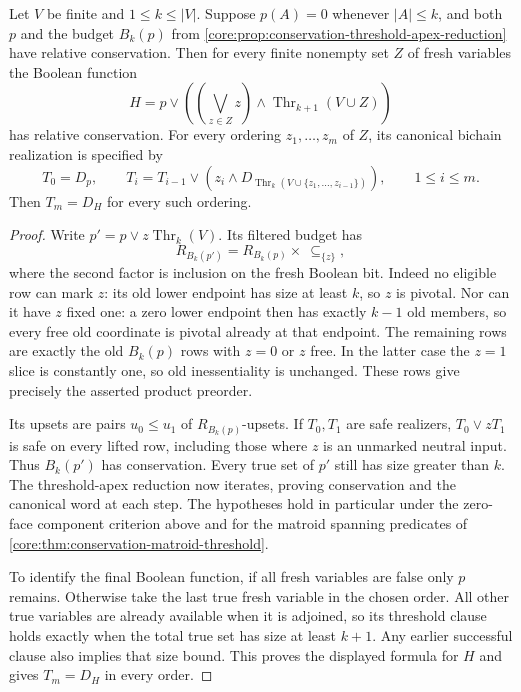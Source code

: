 \begin{corollary}
\label{core:cor:conservation-iterated-threshold}
Let $V$ be finite and $1\leq k\leq|V|$. Suppose $p(A)=0$ whenever
$|A|\leq k$, and both $p$ and the budget $B_k(p)$ from
\cref{core:prop:conservation-threshold-apex-reduction} have relative
conservation. Then for every finite nonempty set $Z$ of fresh variables
the Boolean function
\[
 H=p\lor\left(\left(\bigvee_{z\in Z}z\right)
                    \land\operatorname{Thr}_{k+1}(V\cup Z)\right)
\]
has relative conservation. For every ordering $z_1,\ldots,z_m$ of $Z$,
its canonical bichain realization is specified by
\[
 T_0=D_p,\qquad
 T_i=T_{i-1}\vee\left(z_i\wedge
 D_{\operatorname{Thr}_k(V\cup\{z_1,\ldots,z_{i-1}\})}\right),
 \qquad 1\leq i\leq m.
\]
Then $T_m=D_H$ for every such ordering.
\end{corollary}
\begin{proof}
Write $p'=p\vee z\operatorname{Thr}_k(V)$. Its filtered budget has
\[
 R_{B_k(p')}=R_{B_k(p)}\times\ {\subseteq}_{\{z\}},
\]
where the second factor is inclusion on the fresh Boolean bit.
Indeed no eligible row can mark $z$: its old lower endpoint has size
at least $k$, so $z$ is pivotal. Nor can it have $z$ fixed one: a zero
lower endpoint then has exactly $k-1$ old members, so every free old
coordinate is pivotal already at that endpoint. The remaining rows are
exactly the old $B_k(p)$ rows with $z=0$ or $z$ free. In the latter case
the $z=1$ slice is constantly one, so old inessentiality is unchanged.
These rows give precisely the asserted product preorder.

Its upsets are pairs $u_0\leq u_1$ of $R_{B_k(p)}$-upsets. If
$T_0,T_1$ are safe realizers, $T_0\vee zT_1$ is safe on every lifted row,
including those where $z$ is an unmarked neutral input.
Thus $B_k(p')$ has conservation. Every true set of $p'$ still has size
greater than $k$. The threshold-apex reduction now iterates, proving
conservation and the canonical word at each step. The hypotheses hold
in particular under the zero-face component criterion above and for the
matroid spanning predicates of \cref{core:thm:conservation-matroid-threshold}.

To identify the final Boolean function, if all fresh variables are false
only $p$ remains. Otherwise take the last true fresh variable in the chosen
order. All other true variables are already available when it is adjoined,
so its threshold clause holds exactly when the total true set has size at
least $k+1$. Any earlier successful clause also implies that size bound.
This proves the displayed formula for $H$ and gives $T_m=D_H$ in every order.
\end{proof}

